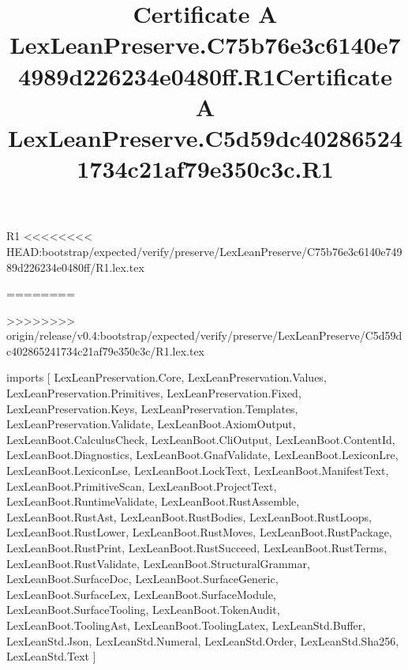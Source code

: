 \begin{lexlean}{R1}
<<<<<<<< HEAD:bootstrap/expected/verify/preserve/LexLeanPreserve/C75b76e3c6140e74989d226234e0480ff/R1.lex.tex
\title{Certificate A LexLeanPreserve.C75b76e3c6140e74989d226234e0480ff.R1}
========
\title{Certificate A LexLeanPreserve.C5d59dc402865241734c21af79e350c3c.R1}
>>>>>>>> origin/release/v0.4:bootstrap/expected/verify/preserve/LexLeanPreserve/C5d59dc402865241734c21af79e350c3c/R1.lex.tex
\begin{coremodule}
imports [
  LexLeanPreservation.Core,
  LexLeanPreservation.Values,
  LexLeanPreservation.Primitives,
  LexLeanPreservation.Fixed,
  LexLeanPreservation.Keys,
  LexLeanPreservation.Templates,
  LexLeanPreservation.Validate,
  LexLeanBoot.AxiomOutput,
  LexLeanBoot.CalculusCheck,
  LexLeanBoot.CliOutput,
  LexLeanBoot.ContentId,
  LexLeanBoot.Diagnostics,
  LexLeanBoot.GnafValidate,
  LexLeanBoot.LexiconLre,
  LexLeanBoot.LexiconLse,
  LexLeanBoot.LockText,
  LexLeanBoot.ManifestText,
  LexLeanBoot.PrimitiveScan,
  LexLeanBoot.ProjectText,
  LexLeanBoot.RuntimeValidate,
  LexLeanBoot.RustAssemble,
  LexLeanBoot.RustAst,
  LexLeanBoot.RustBodies,
  LexLeanBoot.RustLoops,
  LexLeanBoot.RustLower,
  LexLeanBoot.RustMoves,
  LexLeanBoot.RustPackage,
  LexLeanBoot.RustPrint,
  LexLeanBoot.RustSucceed,
  LexLeanBoot.RustTerms,
  LexLeanBoot.RustValidate,
  LexLeanBoot.StructuralGrammar,
  LexLeanBoot.SurfaceDoc,
  LexLeanBoot.SurfaceGeneric,
  LexLeanBoot.SurfaceLex,
  LexLeanBoot.SurfaceModule,
  LexLeanBoot.SurfaceTooling,
  LexLeanBoot.TokenAudit,
  LexLeanBoot.ToolingAst,
  LexLeanBoot.ToolingLatex,
  LexLeanStd.Buffer,
  LexLeanStd.Json,
  LexLeanStd.Numeral,
  LexLeanStd.Order,
  LexLeanStd.Sha256,
  LexLeanStd.Text
]


\end{coremodule}
\end{lexlean}
